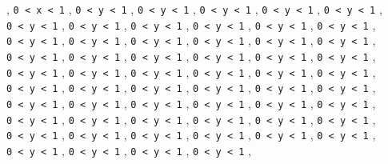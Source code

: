 \documentclass[
  ukrainian,
]{article}
\begin{document}
, \texttt{0\ \textless{}\ x\ \textless{}\ 1} ,
\texttt{0\ \textless{}\ y\ \textless{}\ 1} ,
\texttt{0\ \textless{}\ y\ \textless{}\ 1} ,
\texttt{0\ \textless{}\ y\ \textless{}\ 1} ,
\texttt{0\ \textless{}\ y\ \textless{}\ 1} ,
\texttt{0\ \textless{}\ y\ \textless{}\ 1} ,
\texttt{0\ \textless{}\ y\ \textless{}\ 1} ,
\texttt{0\ \textless{}\ y\ \textless{}\ 1} ,
\texttt{0\ \textless{}\ y\ \textless{}\ 1} ,
\texttt{0\ \textless{}\ y\ \textless{}\ 1} ,
\texttt{0\ \textless{}\ y\ \textless{}\ 1} ,
\texttt{0\ \textless{}\ y\ \textless{}\ 1} ,
\texttt{0\ \textless{}\ y\ \textless{}\ 1} ,
\texttt{0\ \textless{}\ y\ \textless{}\ 1} ,
\texttt{0\ \textless{}\ y\ \textless{}\ 1} ,
\texttt{0\ \textless{}\ y\ \textless{}\ 1} ,
\texttt{0\ \textless{}\ y\ \textless{}\ 1} ,
\texttt{0\ \textless{}\ y\ \textless{}\ 1} ,
\texttt{0\ \textless{}\ y\ \textless{}\ 1} ,
\texttt{0\ \textless{}\ y\ \textless{}\ 1} ,
\texttt{0\ \textless{}\ y\ \textless{}\ 1} ,
\texttt{0\ \textless{}\ y\ \textless{}\ 1} ,
\texttt{0\ \textless{}\ y\ \textless{}\ 1} ,
\texttt{0\ \textless{}\ y\ \textless{}\ 1} ,
\texttt{0\ \textless{}\ y\ \textless{}\ 1} ,
\texttt{0\ \textless{}\ y\ \textless{}\ 1} ,
\texttt{0\ \textless{}\ y\ \textless{}\ 1} ,
\texttt{0\ \textless{}\ y\ \textless{}\ 1} ,
\texttt{0\ \textless{}\ y\ \textless{}\ 1} ,
\texttt{0\ \textless{}\ y\ \textless{}\ 1} ,
\texttt{0\ \textless{}\ y\ \textless{}\ 1} ,
\texttt{0\ \textless{}\ y\ \textless{}\ 1} ,
\texttt{0\ \textless{}\ y\ \textless{}\ 1} ,
\texttt{0\ \textless{}\ y\ \textless{}\ 1} ,
\texttt{0\ \textless{}\ y\ \textless{}\ 1} ,
\texttt{0\ \textless{}\ y\ \textless{}\ 1} ,
\texttt{0\ \textless{}\ y\ \textless{}\ 1} ,
\texttt{0\ \textless{}\ y\ \textless{}\ 1} ,
\texttt{0\ \textless{}\ y\ \textless{}\ 1} ,
\texttt{0\ \textless{}\ y\ \textless{}\ 1} ,
\texttt{0\ \textless{}\ y\ \textless{}\ 1} ,
\texttt{0\ \textless{}\ y\ \textless{}\ 1} ,
\texttt{0\ \textless{}\ y\ \textless{}\ 1} ,
\texttt{0\ \textless{}\ y\ \textless{}\ 1} ,
\texttt{0\ \textless{}\ y\ \textless{}\ 1} ,
\texttt{0\ \textless{}\ y\ \textless{}\ 1} ,
\texttt{0\ \textless{}\ y\ \textless{}\ 1} ,
\texttt{0\ \textless{}\ y\ \textless{}\ 1} ,
\texttt{0\ \textless{}\ y\ \textless{}\ 1} ,
\texttt{0\ \textless{}\ y\ \textless{}\ 1} ,
\texttt{0\ \textless{}\ y\ \textless{}\ 1} ,
\texttt{0\ \textless{}\ y\ \textless{}\ 1} ,
\texttt{0\ \textless{}\ y\ \textless{}\ 1} ,
\texttt{0\ \textless{}\ y\ \textless{}\ 1} ,
\texttt{0\ \textless{}\ y\ \textless{}\ 1} ,
\texttt{0\ \textless{}\ y\ \textless{}\ 1} ,
\texttt{0\ \textless{}\ y\ \textless{}\ 1} ,
\texttt{0\ \textless{}\ y\ \textless{}\ 1} ,
\end{document}
